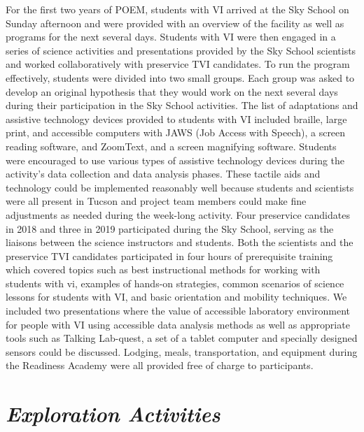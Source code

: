 \documentclass[11pt]{sig-alternate}
\begin{document}
\begin{large}
For the first two years of POEM, students with VI arrived at the Sky School on Sunday afternoon and were provided with an overview of the facility as well as programs for the next several days. Students with VI were then engaged in a series of science activities and presentations provided by the Sky School scientists and worked collaboratively with preservice TVI candidates. To run the program effectively, students were divided into two small groups. Each group was asked to develop an original hypothesis that they would work on the next several days during their participation in the Sky School activities. The list of adaptations and assistive technology devices provided to students with VI included braille, large print, and accessible computers with JAWS (Job Access with Speech), a screen reading software, and ZoomText, and a screen magnifying software. Students were encouraged to use various types of assistive technology devices during the activity’s data collection and data analysis phases. These tactile aids and technology could be implemented reasonably well because students and scientists were all present in Tucson and project team members could make fine adjustments as needed during the week-long activity. Four preservice candidates in 2018 and three in 2019 participated during the Sky School, serving as the liaisons between the science instructors and students. Both the scientists and the preservice TVI candidates participated in four hours of prerequisite training which covered topics such as best instructional methods for working with students with vi, examples of hands-on strategies, common scenarios of science lessons for students with VI, and basic orientation and mobility techniques. We included two presentations where the value of accessible laboratory environment for people with VI using accessible data analysis methods as well as appropriate tools such as Talking Lab-quest, a set of a tablet computer and specially designed sensors could be discussed. Lodging, meals, transportation, and equipment during the Readiness Academy were all provided free of charge to participants.

\section*{\textit{Exploration Activities}}


\end{large}
\end{document}
